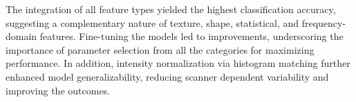 \documentclass[11pt,a4paper]{article}
\begin{document}
The integration of all feature types yielded the highest classification accuracy, 
suggesting a complementary nature of texture, shape, statistical, and frequency-domain features.
Fine-tuning the models led to improvements, underscoring the importance of parameter selection from all the categories for maximizing performance.
In addition, intensity normalization via histogram matching 
further enhanced model generalizability, 
reducing scanner dependent variability 
and improving the outcomes.




 
\end{document}
